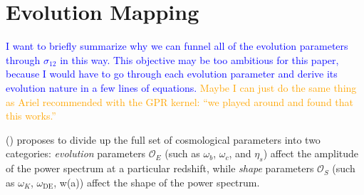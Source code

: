 \begin{comment}

\section{Monte Carlo Markov Chains}




This can be a very brief section, but I want to discuss a little bit of how most modern parameter inference works because it motivates the need for extremely fast power spectrum computation. It provides a sort of conceptual bridge between our ``pure'' goal (quantifying the cosmos) and the nitty-gritty bulk of the paper (optimizing emulator performance).

Metropolis-Hastings algorithm.

We don't know what the true probability distribution of power spectra is. In order to build this distribution with simulation results, we simply draw from the distribution. \textcolor{orange}{Refer to ``Data to Insights'' lecture notes in order to tighten this description.}

\end{comment}

\section{Evolution Mapping}
\label{sec: ev_mapping_intro}

\textcolor{blue}{I want to briefly summarize why we can funnel all of the 
evolution parameters through $\sigma_{12}$ in this way. This objective may be
too ambitious for this paper, because I would have to go through each
evolution parameter and derive its evolution nature in a few lines of 
equations.} \textcolor{orange}{Maybe I can just do the same thing as Ariel
recommended with the GPR kernel: ``we played around and found that this
works.''}

() proposes to divide up the full set of cosmological
parameters into two categories: \textit{evolution} parameters $\mathcal{O}_E$
(such as $\omega_b$, $\omega_c$, and $\eta_s$)
affect the amplitude of the power spectrum at a particular redshift, while
\textit{shape} parameters $\mathcal{O}_S$
(such as $\omega_K$, $\omega_\text{DE}$, w(a))
affect the shape of the power
spectrum.

